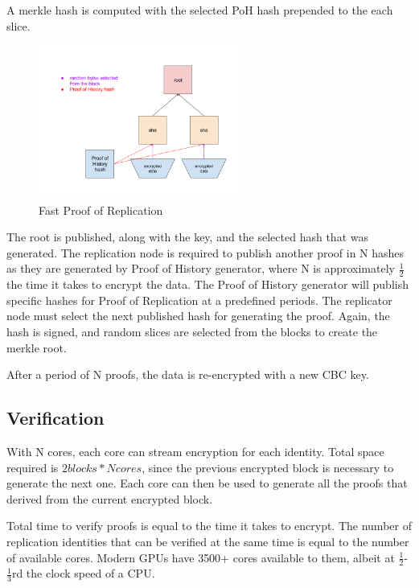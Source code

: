 \documentclass[12pt]{article}
\begin{document}
A merkle hash is computed with the selected PoH hash prepended to the each slice.

\begin{figure}
  \begin{center}
    \centering
    \includegraphics[width=0.6\textwidth]{figures/fig_8.png}
    \caption[Fig 8]{Fast Proof of Replication\label{fig_8}}
  \end{center}
  \end{figure}

The root is published, along with the key, and the selected hash that was generated. The replication node is required to publish another proof in N hashes as they are generated by Proof of History generator, where N is approximately \(\frac{1}{2}\) the time it takes to encrypt the data. The Proof of History generator will publish specific hashes for Proof of Replication at a predefined periods. The replicator node must select the next published hash for generating the proof. Again, the hash is signed, and random slices are selected from the blocks to create the merkle root.

After a period of N proofs, the data is re-encrypted with a new CBC key.
\subsection{Verification}

With N cores, each core can stream encryption for each identity. Total space required is \(2 blocks * N cores\), since the previous encrypted block is necessary to generate the next one. Each core can then be used to generate all the proofs that derived from the current encrypted block.

Total time to verify proofs is equal to the time it takes to encrypt. The number of replication identities that can be verified at the same time is equal to the number of available cores. Modern GPUs have 3500+ cores available to them, albeit at \(\frac{1}{2}\)-\(\frac{1}{3}\)rd the clock speed of a CPU.
\end{document}
